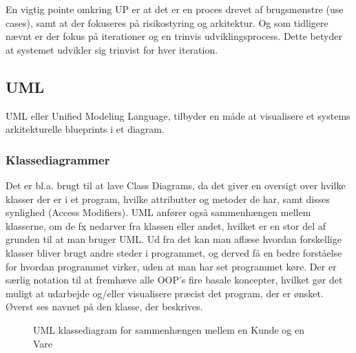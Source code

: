 En vigtig pointe omkring UP er at det er en proces drevet af brugsmønstre (use cases), samt at der fokuseres på risikostyring og arkitektur. Og som tidligere nævnt er der fokus på iterationer og en trinvis udviklingsprocess. Dette betyder at systemet udvikler sig trinvist for hver iteration.


\subsection{UML}



UML eller Unified Modeling Language, tilbyder en måde at visualisere et systems arkitekturelle blueprints i et diagram. 





\subsubsection{Klassediagrammer}

Det er bl.a. brugt til at lave Class Diagrams, da det giver en oversigt over hvilke klasser der er i et program, hvilke attributter og metoder de har, samt disses synlighed (Access Modifiers). UML anfører også sammenhængen mellem klasserne, om de fx nedarver fra klassen eller andet, hvilket er en stor del af grunden til at man bruger UML.  Ud fra det kan man aflæse hvordan forskellige klasser bliver brugt andre steder i programmet, og derved få en bedre forståelse for hvordan programmet virker, uden at man har set programmet køre. Der er særlig notation til at fremhæve alle OOP's fire basale koncepter, hvilket gør det muligt at udarbejde og/eller visualisere præcist det program, der er ønsket. Øverst ses navnet på den klasse, der beskrives. 

\begin{wrapfigure}{r}{0.30\textwidth}
    \vspace{0cm}
  \caption{UML klassediagram for sammenhængen mellem en Kunde og en Vare}
  \label{fig:UML eksempel}
\end{wrapfigure} 

